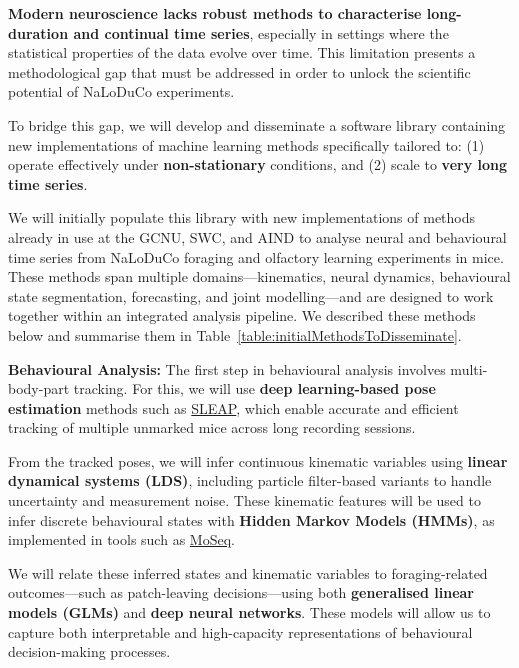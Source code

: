 

\textbf{Modern neuroscience lacks robust methods to characterise long-duration
and continual time series}, especially in settings where the statistical
properties of the data evolve over time. This limitation presents a
methodological gap that must be addressed in order to unlock the scientific
potential of NaLoDuCo experiments.

To bridge this gap, we will develop and disseminate a software library
containing new implementations of machine learning methods specifically
tailored to: (1) operate effectively under \textbf{non-stationary} conditions,
and (2) scale to \textbf{very long time series}.

\label{sec:initialListOfMethods}

We will initially populate this library with new implementations of methods
already in use at the GCNU, SWC, and AIND to analyse neural and behavioural time
series from NaLoDuCo foraging and olfactory learning experiments in mice. These
methods span multiple domains—kinematics, neural dynamics, behavioural state
segmentation, forecasting, and joint modelling—and are designed to work together
within an integrated analysis pipeline. We described these methods below and
summarise them in Table~\ref{table:initialMethodsToDisseminate}.

\vspace{1em}
\noindent\textbf{Behavioural Analysis:}  
The first step in behavioural analysis involves multi-body-part tracking. For
this, we will use \textbf{deep learning-based pose estimation} methods such as
\href{https://github.com/talmolab/sleap}{SLEAP}, which enable accurate and
efficient tracking of multiple unmarked mice across long recording sessions.

From the tracked poses, we will infer continuous kinematic variables using
\textbf{linear dynamical systems (LDS)}, including particle filter-based
variants to handle uncertainty and measurement noise. These kinematic features
will be used to infer discrete behavioural states with \textbf{Hidden Markov
Models (HMMs)}, as implemented in tools such as
\href{https://dattalab.github.io/moseq2-website/index.html}{MoSeq}.

We will relate these inferred states and kinematic variables to
foraging-related outcomes—such as patch-leaving decisions—using both
\textbf{generalised linear models (GLMs)} and \textbf{deep neural networks}.
These models will allow us to capture both interpretable and high-capacity
representations of behavioural decision-making processes.


